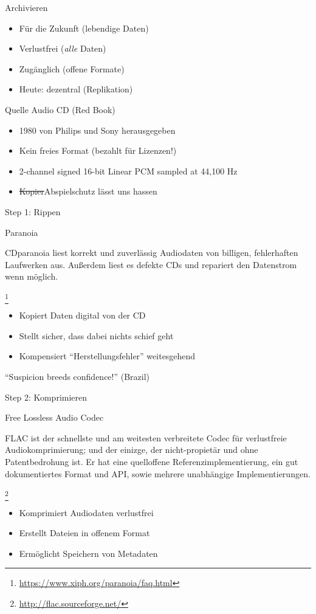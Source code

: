 \documentclass[aspectratio=1610]{beamer}
\newcommand{\src}[1]{
  \raggedright{
    \footnote{
      \small{\url{#1}}
    }
  }
}
\newcommand{\concept}[2]{
  \footnotesize{
    \begin{block}{#1}
      \pause
      #2
    \end{block}
  }
}
\begin{document}
  \begin{frame}{Archivieren}
    \begin{itemize}
      \item Für die Zukunft (lebendige Daten)
      \item Verlustfrei (\textsl{alle} Daten)
      \item Zugänglich (offene Formate)
      \item Heute: dezentral (Replikation)
    \end{itemize}
  \end{frame}

  \begin{frame}{Quelle}
    Audio CD (Red Book)
    \begin{itemize}
      \item 1980 von Philips und Sony herausgegeben
      \item Kein freies Format (bezahlt für Lizenzen!)
      \item 2-channel signed 16-bit Linear PCM sampled at 44,100 Hz
      \item \sout{Kopier}Abspielschutz lässt uns hassen
    \end{itemize}
  \end{frame}

  \begin{frame}{Step 1: Rippen}
    \concept{Paranoia}{
      CDparanoia liest korrekt und zuverlässig Audiodaten von billigen,
      fehlerhaften Laufwerken aus. Außerdem liest es defekte CDs und repariert
      den Datenstrom wenn möglich.
      \src{https://www.xiph.org/paranoia/faq.html}
    }
    \begin{itemize}
      \pause
      \item Kopiert Daten digital von der CD
      \pause
      \item Stellt sicher, dass dabei nichts schief geht
      \pause
      \item Kompensiert “Herstellungsfehler” weitesgehend
    \end{itemize}
    \pause
    “Suspicion breeds confidence!” (Brazil)
  \end{frame}


  \begin{frame}{Step 2: Komprimieren}
    \concept{Free Lossless Audio Codec}{
      FLAC ist der schnellste und am weitesten verbreitete Codec für
      verlustfreie Audiokomprimierung; und der einizge, der nicht-propietär und
      ohne Patentbedrohung ist. Er hat eine quelloffene Referenzimplementierung,
      ein gut dokumentiertes Format und API, sowie mehrere unabhängige
      Implementierungen.\src{http://flac.sourceforge.net/}
    }
    \begin{itemize}
      \pause
      \item Komprimiert Audiodaten verlustfrei
      \pause
      \item Erstellt Dateien in offenem Format
      \pause
      \item Ermöglicht Speichern von Metadaten
    \end{itemize}
  \end{frame}
\end{document}
